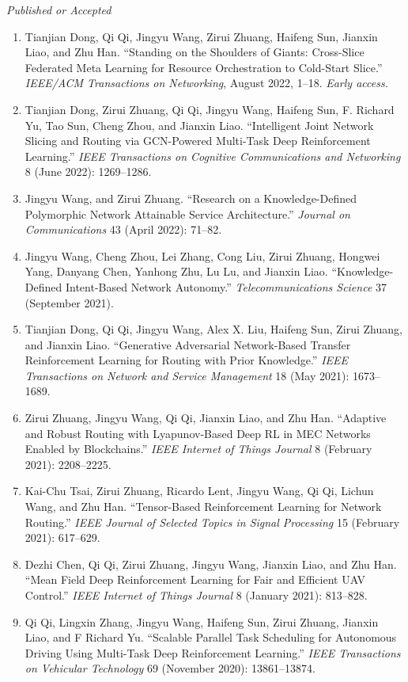 \documentclass[letterpaper,11pt]{article}
\newcommand{\contentlength}{5.25in} %
\begin{document}
\begin{tcolorbox}[flush right,breakable,colback=white,colframe=white,width=\contentlength]
		\textit{Published or Accepted}
		\begin{enumerate}[itemsep=0mm]
			\item Tianjian Dong, Qi Qi, Jingyu Wang, Zirui Zhuang, Haifeng Sun, Jianxin Liao, and Zhu Han. “Standing on the Shoulders of Giants: Cross-Slice Federated Meta Learning for Resource Orchestration to Cold-Start Slice.” \textit{IEEE/ACM Transactions on Networking}, August 2022, 1–18. \textit{Early access.}
			\item Tianjian Dong, Zirui Zhuang, Qi Qi, Jingyu Wang, Haifeng Sun, F. Richard Yu, Tao Sun, Cheng Zhou, and Jianxin Liao. “Intelligent Joint Network Slicing and Routing via GCN-Powered Multi-Task Deep Reinforcement Learning.” \textit{IEEE Transactions on Cognitive Communications and Networking} 8 (June 2022): 1269–1286.
			\item Jingyu Wang, and Zirui Zhuang. “Research on a Knowledge-Defined Polymorphic Network Attainable Service Architecture.” \textit{Journal on Communications} 43 (April 2022): 71–82.
			\item Jingyu Wang, Cheng Zhou, Lei Zhang, Cong Liu, Zirui Zhuang, Hongwei Yang, Danyang Chen, Yanhong Zhu, Lu Lu, and Jianxin Liao. “Knowledge-Defined Intent-Based Network Autonomy.” \textit{Telecommunications Science} 37 (September 2021).
			\item Tianjian Dong, Qi Qi, Jingyu Wang, Alex X. Liu, Haifeng Sun, Zirui Zhuang, and Jianxin Liao. “Generative Adversarial Network-Based Transfer Reinforcement Learning for Routing with Prior Knowledge.” \textit{IEEE Transactions on Network and Service Management} 18 (May 2021): 1673–1689.
			\item Zirui Zhuang, Jingyu Wang, Qi Qi, Jianxin Liao, and Zhu Han. “Adaptive and Robust Routing with Lyapunov-Based Deep RL in MEC Networks Enabled by Blockchains.” \textit{IEEE Internet of Things Journal} 8 (February 2021): 2208–2225.
			\item Kai-Chu Tsai, Zirui Zhuang, Ricardo Lent, Jingyu Wang, Qi Qi, Lichun Wang, and Zhu Han. “Tensor-Based Reinforcement Learning for Network Routing.” \textit{IEEE Journal of Selected Topics in Signal Processing} 15 (February 2021): 617–629.
			\item Dezhi Chen, Qi Qi, Zirui Zhuang, Jingyu Wang, Jianxin Liao, and Zhu Han. “Mean Field Deep Reinforcement Learning for Fair and Efficient UAV Control.” \textit{IEEE Internet of Things Journal} 8 (January 2021): 813–828.
			\item Qi Qi, Lingxin Zhang, Jingyu Wang, Haifeng Sun, Zirui Zhuang, Jianxin Liao, and F Richard Yu. “Scalable Parallel Task Scheduling for Autonomous Driving Using Multi-Task Deep Reinforcement Learning.” \textit{IEEE Transactions on Vehicular Technology} 69 (November 2020): 13861–13874.

\end{enumerate}
\end{tcolorbox}
\end{document}
